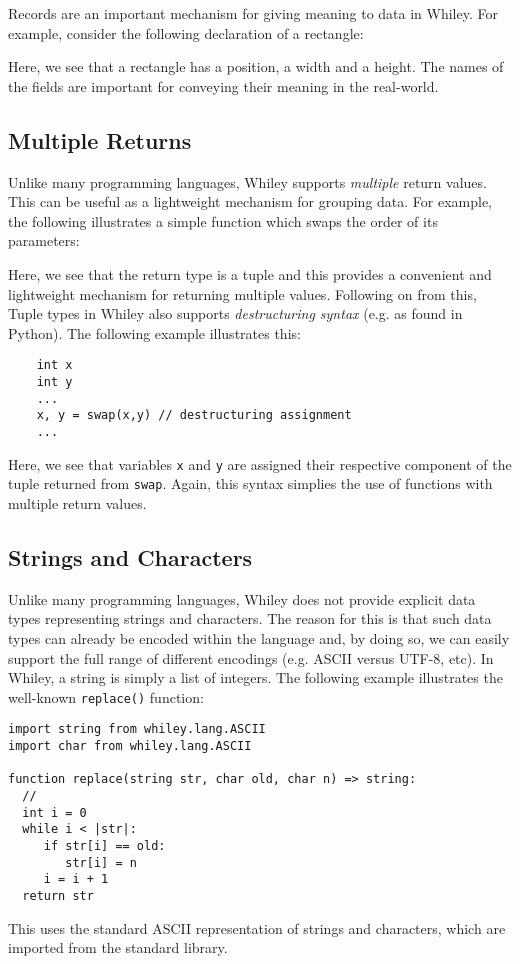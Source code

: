 Records are an important mechanism for giving meaning to data in Whiley.  For example, consider the following declaration of a rectangle:



Here, we see that a rectangle has a position, a width and a height.  The names of the fields are important for conveying their meaning in the real-world.

\subsection{Multiple Returns}

Unlike many programming languages, Whiley supports {\em multiple} return values.  This can be useful as a lightweight mechanism for grouping data.  For example, the following illustrates a simple function which swaps the order of its parameters:



Here, we see that the return type is a tuple and this provides a convenient and lightweight mechanism for returning multiple values.  Following on from this, Tuple types in Whiley also supports {\em destructuring syntax} (e.g. as found in Python).  The following example illustrates this:

\begin{lstlisting}
    int x
    int y
    ...
    x, y = swap(x,y) // destructuring assignment
    ...        
\end{lstlisting}

Here, we see that variables \lstinline{x} and \lstinline{y} are assigned their respective component of the tuple returned from \lstinline{swap}.  Again, this syntax simplies the use of functions with multiple return values.

\subsection{Strings and Characters}

Unlike many programming languages, Whiley does not provide explicit data types representing strings and characters.  The reason for this is that such data types can already be encoded within the language and, by doing so, we can easily support the full range of different encodings (e.g. ASCII versus UTF-8, etc).  In Whiley, a string is simply a list of integers.  The following example illustrates the well-known \lstinline{replace()} function:

\begin{lstlisting}
import string from whiley.lang.ASCII
import char from whiley.lang.ASCII

function replace(string str, char old, char n) => string:
  //
  int i = 0
  while i < |str|:
     if str[i] == old:
        str[i] = n
     i = i + 1
  return str
\end{lstlisting}

This uses the standard ASCII representation of strings and characters, which are imported from the standard library.  